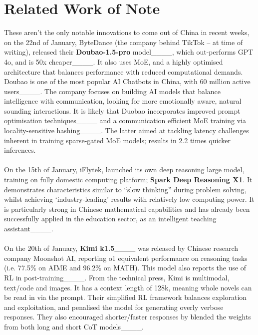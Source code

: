 \section{Related Work of Note}
These aren’t the only notable innovations to come out of China in recent weeks, on the 22nd of January, ByteDance (the company behind TikTok – at time of writing), released their \textbf{Doubao-1.5-pro} model____, which out-performs GPT 4o, and is 50x cheaper____.  It also uses MoE, and a highly optimised architecture that balances performance with reduced computational demands.  Doubao is one of the most popular AI Chatbots in China, with 60 million active users____.  The company focuses on building AI models that balance intelligence with communication, looking for more emotionally aware, natural sounding interactions. It is likely that Duobao incorporates improved prompt optimisation techniques____ and a communication efficient MoE training via locality-sensitive hashing____.  The latter aimed at tackling latency challenges inherent in training sparse-gated MoE models; results in 2.2 times quicker inferences.

\paragraph{}On the 15th of January, iFlytek, launched its own deep reasoning large model, training on fully domestic computing platform; \textbf{Spark Deep Reasoning X1}.  It demonstrates characteristics similar to “slow thinking” during problem solving, whilst achieving ‘industry-leading’ results with relatively low computing power.  It is particularly strong in Chinese mathematical capabilities and has already been successfully applied in the education sector, as an intelligent teaching assistant____.

\paragraph{}On the 20th of January, \textbf{Kimi k1.5}____ was released by Chinese research company Moonshot AI, reporting o1 equivalent performance on reasoning tasks (i.e. 77.5\% on AIME and 96.2\% on MATH).  This model also reports the use of RL in post-training____.  From the technical press, Kimi is multimodal, text/code and images.  It has a context length of 128k, meaning whole novels can be read in via the prompt.  Their simplified RL framework balances exploration and exploitation, and penalised the model for generating overly verbose responses.  They also encouraged shorter/faster responses by blended the weights from both long and short CoT models____.  

